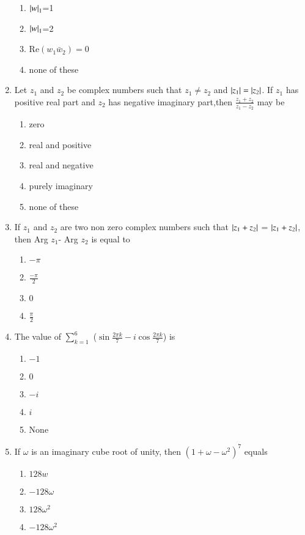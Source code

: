 \begin{enumerate}[label=\arabic*.,ref=\thesubsection.\theenumi]
\begin{enumerate}
    \item    $\left\vert w\right\vert_1 $=1 
    \item   $\left\vert w\right\vert_1 $=2
    \item   Re$(w_1 \bar w_2)=0$
    \item   none of these
    \end{enumerate}
    \item Let $z_1$ and $z_2$ be complex numbers such that $z_1\neq z_2$ and  $\left\vert z_1\right\vert = \left\vert z_2\right\vert $. If $z_1$ has positive real part and $z_2$ has negative imaginary part,then  $\frac{z_1+z_2}{z_1-z_2}$ may be
    \begin{enumerate}
    \item    zero
    \item   real and positive
    \item   real and negative    
    \item   purely imaginary  
    \item none of these
    \end{enumerate}
    \item If $z_1$ and $z_2$ are two non zero complex numbers such that $\left\vert z_1+z_2\right\vert$ = $\left\vert z_1+ z_2\right\vert$, then Arg $z_1$- Arg $z_2$ is equal to
    \begin{enumerate}
    \item    $-\pi$ 
    \item   $\frac{-\pi}{2}$
    \item   $0$    
    \item  $\frac{\pi}{2}$
    \end{enumerate}
    \item The value of $\sum_{k=1}^{6}$ ($\sin\frac{2\pi k}{7}-i\cos\frac{2\pi k}{7}$) is 
    \begin{enumerate}
    \item    $-1$ 
    \item    $0$
    \item   $-i$    
    \item   $i$  
    \item None
    \end{enumerate}
    \item If $\omega$ is an imaginary cube root of unity, then $(1+\omega-\omega^2)^7$ equals 
    \begin{enumerate}
    \item    $128w$ 
    \item    $-128\omega$
    \item   $128\omega^2$    
    \item   $-128\omega^2$

\end{enumerate}
\end{enumerate}
